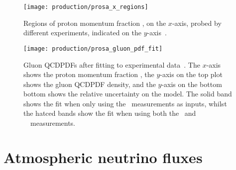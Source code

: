 %   

\begin{figure}
  \centering
  \texttt{[image: production/prosa\_x\_regions]}
  \caption{%
    Regions of proton momentum fraction \bjorkenx, on the $x$-axis, probed by 
    different experiments, indicated on the $y$-axis~\cite{Zenaiev:2015rfa}.
  }
  \label{fig:prod:theory:prosa_x_regions}
\end{figure}

\begin{figure}
  \centering
  \texttt{[image: production/prosa\_gluon\_pdf\_fit]}
  \caption{%
    Gluon \acp{QCDPDF} after fitting to experimental 
    data~\cite{Zenaiev:2015rfa}.
    The $x$-axis shows the proton momentum fraction \bjorkenx, the $y$-axis on 
    the top plot shows the gluon \ac{QCDPDF} density, and the $y$-axis on the 
    bottom bottom shows the relative uncertainty on the model.
    The solid band shows the fit when only using the \hera\ measurements as 
    inputs, whilst the hatced bands show the fit when using both the \hera\ and 
    \ \lhcb\ measurements.
  }
  \label{fig:prod:theory:prosa_gluon_pdf_fit}
\end{figure}

\section{Atmospheric neutrino fluxes}
\label{chap:prod:theory:neutrinos}

